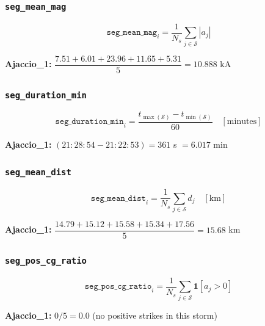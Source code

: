 \documentclass[12pt,a4paper]{article}
\newcommand{\feat}[1]{\texttt{\textbf{#1}}}
\begin{document}
\subsubsection*{\feat{seg\_mean\_mag}}

\begin{formulabox}
\[
  \texttt{seg\_mean\_mag}_i = \frac{1}{N_s} \sum_{j \in \mathcal{S}} |a_j|
\]
\end{formulabox}

\textbf{Ajaccio\_1:} $\dfrac{7.51 + 6.01 + 23.96 + 11.65 + 5.31}{5} = 10.888$ kA

\subsubsection*{\feat{seg\_duration\_min}}

\begin{formulabox}
\[
  \texttt{seg\_duration\_min}_i = \frac{t_{\max(\mathcal{S})} - t_{\min(\mathcal{S})}}{60} \quad [\text{minutes}]
\]
\end{formulabox}

\textbf{Ajaccio\_1:} $(21{:}28{:}54 - 21{:}22{:}53) = 361$ s $= 6.017$ min

\subsubsection*{\feat{seg\_mean\_dist}}

\begin{formulabox}
\[
  \texttt{seg\_mean\_dist}_i = \frac{1}{N_s} \sum_{j \in \mathcal{S}} d_j \quad [\text{km}]
\]
\end{formulabox}

\textbf{Ajaccio\_1:} $\dfrac{14.79 + 15.12 + 15.58 + 15.34 + 17.56}{5} = 15.68$ km

\subsubsection*{\feat{seg\_pos\_cg\_ratio}}

\begin{formulabox}
\[
  \texttt{seg\_pos\_cg\_ratio}_i = \frac{1}{N_s} \sum_{j \in \mathcal{S}} \mathbf{1}[a_j > 0]
\]
\end{formulabox}

\textbf{Ajaccio\_1:} $0/5 = 0.0$ (no positive strikes in this storm)

\vspace{1em}

\end{document}
